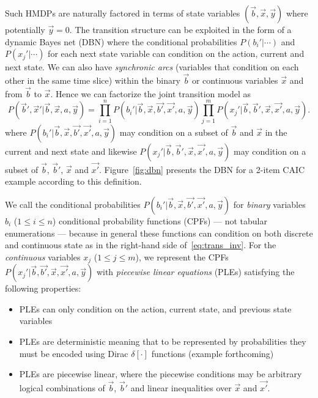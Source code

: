 \documentclass[twoside,11pt]{article}
\begin{document}

Such HMDPs are naturally factored \cite{boutilier99dt}
in terms of state variables $(\vec{b},\vec{x},\vec{y})$ where potentially $\vec{y} =0$. The transition structure can be exploited in the form of a dynamic Bayes
net (DBN) \cite{dbn} where the conditional probabilities
$P(b_i'|\cdots)$ and $P(x_j'|\cdots)$ for each next state variable can
condition on the action, current and next state. 
We can also have \emph{synchronic arcs} (variables that condition on each
other in the same time slice) within the binary $\vec{b}$ or
continuous variables $\vec{x}$ and from $\vec{b}$ to $\vec{x}$.%
Hence we can factorize the joint transition model as
{%
\begin{equation}
P(\vec{b}',\vec{x}'|\vec{b},\vec{x},a,\vec{y}) = 
\prod_{i=1}^n P(b_i'|\vec{b},\vec{x},\vec{b'},\vec{x'},a,\vec{y}) \prod_{j=1}^m P(x_j'|\vec{b},\vec{b}',\vec{x},\vec{x'},a,\vec{y}). \nonumber 
\end{equation}}
where $P(b_i'|\vec{b},\vec{x},\vec{b'},\vec{x'},a,\vec{y})$ may condition on a subset of
$\vec{b}$ and $\vec{x}$ in the current and next state and likewise 
$P(x_j'|\vec{b},\vec{b}',\vec{x},\vec{x'},a,\vec{y})$ may condition on a subset of
$\vec{b}$, $\vec{b}'$, $\vec{x}$ and $\vec{x'}$. Figure~\ref{fig:dbn} presents the DBN for a 2-item CAIC example according to this definition.  

We call the conditional probabilities
$P(b_i'|\vec{b},\vec{x},\vec{b'},\vec{x'},a,\vec{y})$ for \emph{binary} variables $b_i$
($1 \leq i \leq n$) conditional probability functions (CPFs) --- not
tabular enumerations --- because in general these functions can
condition on both discrete and continuous state as
in the right-hand side of~\eqref{eq:trans_inv}.  For the \emph{continuous} variables
$x_j$ ($1 \leq j \leq m$), we represent the CPFs
$P(x_j'|\vec{b},\vec{b'},\vec{x},\vec{x'},a,\vec{y})$ with \emph{piecewise
linear equations} (PLEs) satisfying the following properties: 
\begin{itemize}
\item PLEs can only condition on the action, current state, and previous state variables
\item PLEs are deterministic meaning that to be represented by probabilities they
must be encoded using Dirac $\delta[\cdot]$ functions (example forthcoming)
\item PLEs are piecewise linear, where the piecewise conditions may be arbitrary logical combinations of $\vec{b}$, $\vec{b}'$ 
and linear inequalities over $\vec{x}$ and $\vec{x'}$.  
\end{itemize}
\end{document}

